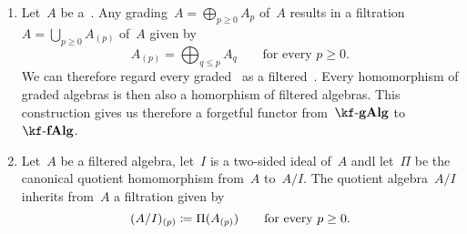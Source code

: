 \begin{construction}
	\leavevmode
	\begin{enumerate}
		\item
			Let~$A$ be a~\algebra{$\kf$}.
			Any grading~$A = \bigoplus_{p \geq 0} A_p$ of~$A$ results in a filtration~$A = \bigcup_{p \geq 0} A_{(p)}$ of~$A$ given by
			\[
				A_{(p)}
				=
				\bigoplus_{q \leq p} A_q
				\qquad
				\text{for every~$p \geq 0$.}
			\]
			We can therefore regard every graded~{\algebra{$\kf$}} as a filtered~{\algebra{$\kf$}}.
			Every homomorphism of graded algebras is then also a homorphism of filtered algebras.
			This construction gives us therefore a forgetful functor from~$\cgAlg{\kf}$ to~$\cfAlg{\kf}$.
		\item 
			Let~$A$ be a filtered algebra, let~$I$ is a two-sided ideal of~$A$ andl let~$\Pi$ be the canonical quotient homomorphism from~$A$ to~$A/I$.
			The quotient algebra~$A/I$ inherits from~$A$ a filtration given by
			\[
				(A/I)_{(p)}
				\coloneqq
				\Pi(A_{(p)})
				\qquad
				\text{for every~$p \geq 0$.}
			\]
	\end{enumerate}
\end{construction}


